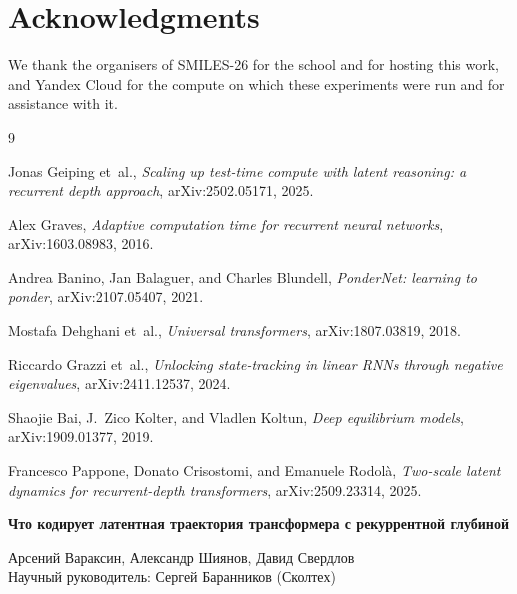 \documentclass{zapiski}
\begin{document}
\section*{Acknowledgments}

We thank the organisers of SMILES-26 for the school and for hosting this work, and Yandex Cloud for
the compute on which these experiments were run and for assistance with it.

\begin{thebibliography}{9}

Jonas Geiping et~al., \emph{Scaling up test-time compute with latent reasoning: a recurrent depth
approach}, arXiv:2502.05171, 2025.

Alex Graves, \emph{Adaptive computation time for recurrent neural networks}, arXiv:1603.08983,
2016.

Andrea Banino, Jan Balaguer, and Charles Blundell, \emph{PonderNet: learning to ponder},
arXiv:2107.05407, 2021.

Mostafa Dehghani et~al., \emph{Universal transformers}, arXiv:1807.03819, 2018.

Riccardo Grazzi et~al., \emph{Unlocking state-tracking in linear RNNs through negative
eigenvalues}, arXiv:2411.12537, 2024.

Shaojie Bai, J.~Zico Kolter, and Vladlen Koltun, \emph{Deep equilibrium models},
arXiv:1909.01377, 2019.

Francesco Pappone, Donato Crisostomi, and Emanuele Rodol\`a, \emph{Two-scale latent dynamics for
recurrent-depth transformers}, arXiv:2509.23314, 2025.

\end{thebibliography}

\vspace{1em}
\begin{center}
\foreignlanguage{russian}{\textbf{\large Что кодирует латентная траектория трансформера
с рекуррентной глубиной}}
\end{center}

\begin{center}
\foreignlanguage{russian}{Арсений Вараксин, Александр Шиянов, Давид Свердлов}
\\
\foreignlanguage{russian}{Научный руководитель: Сергей Баранников (Сколтех)}
\end{center}
\end{document}
